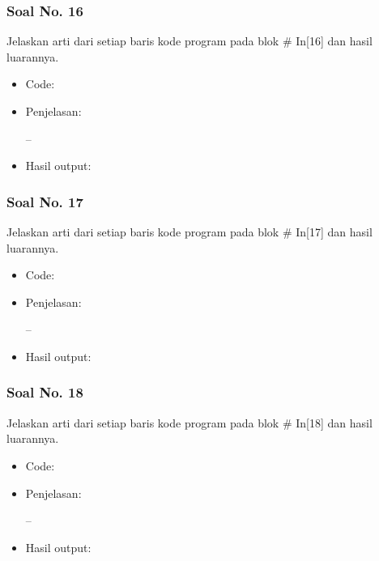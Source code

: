\subsubsection{Soal No. 16}
Jelaskan arti dari setiap baris kode program pada blok \# In[16] dan hasil luarannya.

\begin{itemize}
\item Code:


\item Penjelasan:

--

\item Hasil output:

\end{itemize}

\subsubsection{Soal No. 17}
Jelaskan arti dari setiap baris kode program pada blok \# In[17] dan hasil luarannya.

\begin{itemize}
\item Code:


\item Penjelasan:

--

\item Hasil output:

\end{itemize}

\subsubsection{Soal No. 18}
Jelaskan arti dari setiap baris kode program pada blok \# In[18] dan hasil luarannya.

\begin{itemize}
\item Code:


\item Penjelasan:

--

\item Hasil output:

\end{itemize}

